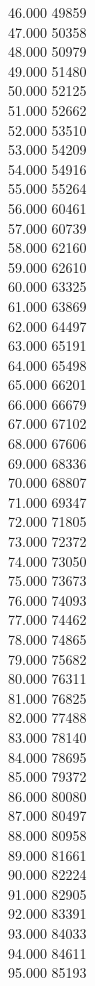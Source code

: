 { 46.000	49859 \\
 47.000	50358 \\
 48.000	50979 \\
 49.000	51480 \\
 50.000	52125 \\
 51.000	52662 \\
 52.000	53510 \\
 53.000	54209 \\
 54.000	54916 \\
 55.000	55264 \\
 56.000	60461 \\
 57.000	60739 \\
 58.000	62160 \\
 59.000	62610 \\
 60.000	63325 \\
 61.000	63869 \\
 62.000	64497 \\
 63.000	65191 \\
 64.000	65498 \\
 65.000	66201 \\
 66.000	66679 \\
 67.000	67102 \\
 68.000	67606 \\
 69.000	68336 \\
 70.000	68807 \\
 71.000	69347 \\
 72.000	71805 \\
 73.000	72372 \\
 74.000	73050 \\
 75.000	73673 \\
 76.000	74093 \\
 77.000	74462 \\
 78.000	74865 \\
 79.000	75682 \\
 80.000	76311 \\
 81.000	76825 \\
 82.000	77488 \\
 83.000	78140 \\
 84.000	78695 \\
 85.000	79372 \\
 86.000	80080 \\
 87.000	80497 \\
 88.000	80958 \\
 89.000	81661 \\
 90.000	82224 \\
 91.000	82905 \\
 92.000	83391 \\
 93.000	84033 \\
 94.000	84611 \\
 95.000	85193 \\
}
